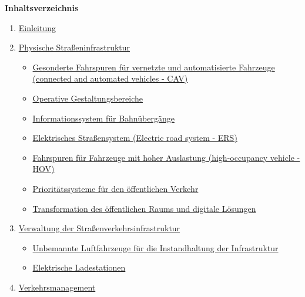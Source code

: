 \documentclass[
]{book}
\providecommand{\tightlist}{%
  \setlength{\itemsep}{0pt}\setlength{\parskip}{0pt}}
\begin{document}
\textbf{Inhaltsverzeichnis}

\begin{enumerate}
\def\labelenumi{\arabic{enumi}.}
\tightlist
\item
  \protect\hyperlink{intro}{Einleitung}
\item
  \protect\hyperlink{infrastructure}{Physische Straßeninfrastruktur}

  \begin{itemize}
  \tightlist
  \item
    \protect\hyperlink{dedicated_lanes}{Gesonderte Fahrspuren für vernetzte und automatisierte Fahrzeuge (connected and automated vehicles - CAV)}\\
  \item
    \protect\hyperlink{ODD}{Operative Gestaltungsbereiche}\\
  \item
    \protect\hyperlink{rail_crossing_info_system}{Informationssystem für Bahnübergänge}\\
  \item
    \protect\hyperlink{ers}{Elektrisches Straßensystem (Electric road system - ERS)}\\
  \item
    \protect\hyperlink{high_occupancy}{Fahrspuren für Fahrzeuge mit hoher Auslastung (high-occupancy vehicle - HOV)}\\
  \item
    \protect\hyperlink{public_trans_priority}{Prioritätssysteme für den öffentlichen Verkehr}\\
  \item
    \protect\hyperlink{transformation_public_space}{Transformation des öffentlichen Raums und digitale Lösungen}\\
  \end{itemize}
\item
  \protect\hyperlink{highway}{Verwaltung der Straßenverkehrsinfrastruktur}

  \begin{itemize}
  \tightlist
  \item
    \protect\hyperlink{uav}{Unbemannte Luftfahrzeuge für die Instandhaltung der Infrastruktur}\\
  \item
    \protect\hyperlink{charging_station}{Elektrische Ladestationen}\\
  \end{itemize}
\item
  \protect\hyperlink{traffic}{Verkehrsmanagement}


\end{enumerate}
\end{document}
